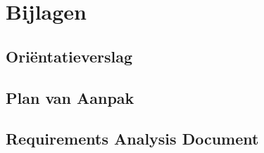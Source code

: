 \section{Bijlagen}
\label{Bijlagen}

\subsection{Ori\"{e}ntatieverslag}

\subsection{Plan van Aanpak}

\subsection{Requirements Analysis Document}
